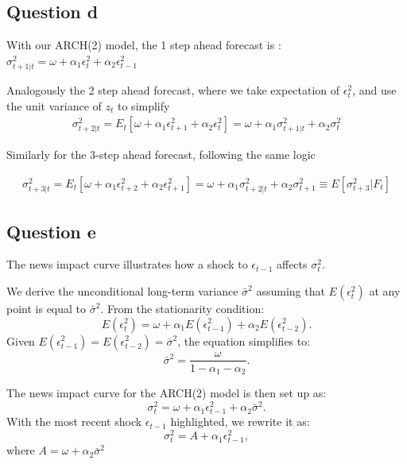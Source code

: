 \documentclass{article}
\begin{document}
\subsection*{Question d}

With our ARCH(2) model, the 1 step ahead forecast is : $\sigma^2_{t+1 | t}  = \omega + \alpha_1  \epsilon^2_{t}  + \alpha_2  \epsilon^2_{t-1}$

Analogously the 2 step ahead forecast, where we take expectation of $\epsilon_t^2$, and use the unit variance of $z_{t}$ to simplify 
\begin{align*}
\sigma^2_{t+2 | t}  = E_t \left[  \omega + \alpha_1  \epsilon^2_{t+1}  + \alpha_2  \epsilon^2_{t}  \right] =   \omega + \alpha_1  \sigma^2_{t+1|t}  + \alpha_2  \sigma^2_{t}  
\end{align*}

Similarly for the 3-step ahead forecast, following the same logic

 \begin{align*}
 	\sigma^2_{t+3 | t} = E_t \left[  \omega + \alpha_1  \epsilon^2_{t+2}  + \alpha_2  \epsilon^2_{t+1}  \right] =   \omega + \alpha_1  \sigma^2_{t+2|t}  + \alpha_2  \sigma^2_{t+1} \equiv E \left[ \sigma^2_{t+3} | F_{t} \right] 
 \end{align*}

\subsection*{Question e}

The news impact curve illustrates how a shock to \( \epsilon_{t-1} \) affects \( \sigma_t^2 \).

We derive the unconditional long-term variance \( \bar{\sigma}^2 \) assuming that \( E(\epsilon_t^2) \) at any point is equal to \( \bar{\sigma}^2 \). From the stationarity condition:
\begin{equation}
E(\epsilon_t^2) = \omega + \alpha_1 E(\epsilon_{t-1}^2) + \alpha_2 E(\epsilon_{t-2}^2).
\end{equation}
Given \( E(\epsilon_{t-1}^2) = E(\epsilon_{t-2}^2) = \bar{\sigma}^2 \), the equation simplifies to:
\begin{equation}
\bar{\sigma}^2 = \frac{\omega}{1 - \alpha_1 - \alpha_2}.
\end{equation}

The news impact curve for the ARCH(2) model is then set up as:
\begin{equation}
\sigma_t^2 = \omega + \alpha_1 \epsilon_{t-1}^2 + \alpha_2 \bar{\sigma}^2.
\end{equation}
With the most recent shock \( \epsilon_{t-1} \) highlighted, we rewrite it as:
\begin{equation}
\sigma_t^2 = A + \alpha_1 \epsilon_{t-1}^2,
\end{equation}
where \( A = \omega + \alpha_2 \bar{\sigma}^2 \)
\end{document}
